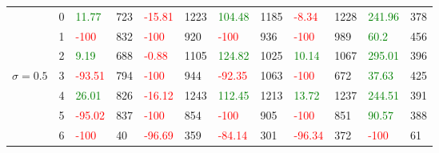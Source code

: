 \begin{table}[!htb]
\begin{adjustwidth}{-0.8in}{-0.9in}
\begin{tabular}{|p{4em}|p{2em}|p{3em}|p{3em}|p{3em}|p{3em}|p{3em}|p{3em}|p{3em}|p{3em}|p{3em}|p{3em}|}
            & 0 & \textcolor{green}{11.77} & 723 & \textcolor{red}{-15.81} & 1223 & \textcolor{green}{104.48} & 1185 & \textcolor{red}{-8.34} & 1228 & \textcolor{green}{241.96} & 378\\\cline{3-12}
            & 1 & \textcolor{red}{-100} & 832 & \textcolor{red}{-100} & 920 & \textcolor{red}{-100} & 936 & \textcolor{red}{-100} & 989 & \textcolor{green}{60.2} & 456\\\cline{3-12}
            & 2 & \textcolor{green}{9.19} & 688 & \textcolor{red}{-0.88} & 1105 & \textcolor{green}{124.82} & 1025 & \textcolor{green}{10.14} & 1067 & \textcolor{green}{295.01} & 396\\\cline{3-12}
            $\sigma=0.5$& 3 & \textcolor{red}{-93.51} & 794 & \textcolor{red}{-100} & 944 & \textcolor{red}{-92.35} & 1063 & \textcolor{red}{-100} & 672 & \textcolor{green}{37.63} & 425\\\cline{3-12}
            & 4 & \textcolor{green}{26.01} & 826 & \textcolor{red}{-16.12} & 1243 & \textcolor{green}{112.45} & 1213 & \textcolor{green}{13.72} & 1237 & \textcolor{green}{244.51} & 391\\\cline{3-12}
            & 5 & \textcolor{red}{-95.02} & 837 & \textcolor{red}{-100} & 854 & \textcolor{red}{-100} & 905 & \textcolor{red}{-100} & 851 & \textcolor{green}{90.57} & 388\\\cline{3-12}
            & 6 & \textcolor{red}{-100} & 40 & \textcolor{red}{-96.69} & 359 & \textcolor{red}{-84.14} & 301 & \textcolor{red}{-96.34} & 372 & \textcolor{red}{-100} & 61\\\hline\hline
            

\end{tabular}
\end{adjustwidth}
\end{table}
